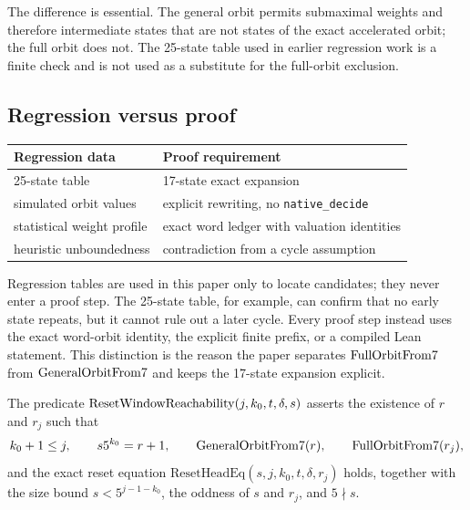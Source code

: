 The difference is essential.  The general orbit permits submaximal
weights and therefore intermediate states that are not states of the
exact accelerated orbit; the full orbit does not.  The 25-state table
used in earlier regression work is a finite check and is not used as a
substitute for the full-orbit exclusion.

\subsection{Regression versus proof}

\begin{center}
\small
\begin{tabular}{@{}p{}p{}@{}}
\toprule
Regression data & Proof requirement \\
\midrule
25-state table & 17-state exact expansion \\
simulated orbit values & explicit rewriting, no \texttt{native\_decide} \\
statistical weight profile & exact word ledger with valuation identities \\
heuristic unboundedness & contradiction from a cycle assumption \\
\bottomrule
\end{tabular}
\end{center}

Regression tables are used in this paper only to locate candidates;
they never enter a proof step.  The 25-state table, for example, can
confirm that no early state repeats, but it cannot rule out a later
cycle.  Every proof step instead uses the exact word-orbit identity,
the explicit finite prefix, or a compiled Lean statement.  This
distinction is the reason the paper separates $\mathrm{FullOrbitFrom7}$ from
$\mathrm{GeneralOrbitFrom7}$ and keeps the 17-state expansion explicit.

\begin{definition}\label{def:reset-window}
The predicate $\mathrm{ResetWindowReachability}(j,k_0,t,\delta,s)$ asserts the existence of
$r$ and $r_j$ such that
\begin{equation*}
  k_0+1\le j,\qquad s5^{k_0}=r+1,\qquad
  \mathrm{GeneralOrbitFrom7}(r),\qquad \mathrm{FullOrbitFrom7}(r_j),
\end{equation*}
and the exact reset equation $\mathrm{ResetHeadEq}(s,j,k_0,t,\delta,r_j)$
holds, together with the size bound $s<5^{j-1-k_0}$, the oddness of
$s$ and $r_j$, and $5\nmid s$.
\end{definition}

